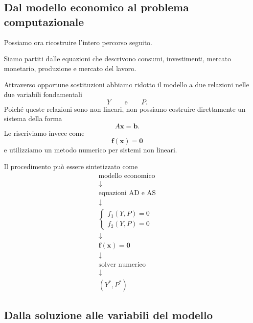 \subsection{Dal modello economico al problema computazionale}

Possiamo ora ricostruire l'intero percorso seguito.

Siamo partiti dalle equazioni che descrivono consumi, investimenti,
mercato monetario, produzione e mercato del lavoro.

Attraverso opportune sostituzioni abbiamo ridotto il modello a due
relazioni nelle due variabili fondamentali
\begin{equation*}
    Y
    \qquad\text{e}\qquad
    P.
\end{equation*}
Poiché queste relazioni sono non lineari, non possiamo costruire
direttamente un sistema della forma
\begin{equation*}
    A\mathbf{x}=\mathbf{b}.
\end{equation*}
Le riscriviamo invece come
\begin{equation*}
    \mathbf{f}(\mathbf{x})=\mathbf{0}
\end{equation*}
e utilizziamo un metodo numerico per sistemi non lineari.

Il procedimento può essere sintetizzato come
\begin{equation*}
\boxed{
\begin{array}{c}
\text{modello economico}\\
\downarrow\\
\text{equazioni AD e AS}\\
\downarrow\\
\begin{cases}
f_1(Y,P)=0\\
f_2(Y,P)=0
\end{cases}\\
\downarrow\\
\mathbf{f}(\mathbf{x})=\mathbf{0}\\
\downarrow\\
\text{solver numerico}\\
\downarrow\\
(Y^*,P^*)
\end{array}
}
\end{equation*}

\subsection{Dalla soluzione alle variabili del modello}

